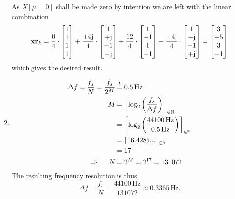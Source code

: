 \documentclass[11pt,a4paper,DIV=12]{scrartcl}
\begin{document}
\begin{Loesung}
\begin{enumerate}[label=\alph*)]
	As $X[\mu=0]$ shall be made zero by intention we are left with the
  linear combination
	\begin{equation}
  \mathbf{xr}_k=
  \frac{0}{4}\cdot\begin{bmatrix}1\\1\\1\\1\end{bmatrix}+
	\frac{+4\im}{4}\cdot\begin{bmatrix}1\\+\im\\-1\\-\im\end{bmatrix}+
	\frac{12}{4}\cdot\begin{bmatrix}1\\-1\\1\\-1\end{bmatrix}+
	\frac{-4\im}{4}\cdot\begin{bmatrix}1\\-\im\\-1\\+\im\end{bmatrix}
  =
  \begin{bmatrix}
  3\\-5\\3\\-1
  \end{bmatrix}
	\end{equation}
  which gives the desired result.
%
  \item \begin{align}
  \Delta f=\frac{f_s}{N}=\frac{f_s}{2^M}&\stackrel{!}{=}0.5\,\text{Hz}\nonumber\\
  M&=\left\lceil\log_{2}\left(\frac{f_s}{\Delta f}\right)\right\rceil_{\in\mathbb{N}}\nonumber\\
  &=\left\lceil\log_{2}\left(\frac{44100\,\text{Hz}}{0.5\,\text{Hz}}\right)\right\rceil_{\in\mathbb{N}}\nonumber\\
  &=\left\lceil16.4285...\right\rceil_{\in\mathbb{N}}\nonumber\\
  &=17\nonumber\\
  \Rightarrow\hspace{5mm} N&=2^M=2^{17}=131072\nonumber
  \end{align}
  The resulting frequency resolution is thus
  \begin{equation}
  \Delta f=\frac{f_s}{N}=\frac{44100\,\text{Hz}}{131072}\approx0.3365\,\text{Hz}.\nonumber
  \end{equation}
%
\end{enumerate}
\end{Loesung}
\end{document}
